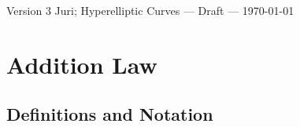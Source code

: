 

Version 3 \scriptsize \hfill Juri; Hyperelliptic Curves --- Draft --- \today
\normalsize

\section{Addition Law}

\subsection{Definitions and Notation}

